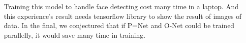 \documentclass[journal, a4paper]{IEEEtran}
\begin{document}
	Training this model to handle face detecting cost many time in a laptop. And this experience's result needs tensorflow library to show the result of images of data. In the final, we conjectured that if P=Net and O-Net could be trained parallelly, it would save many time in training.

\printbibliography

\end{document}
